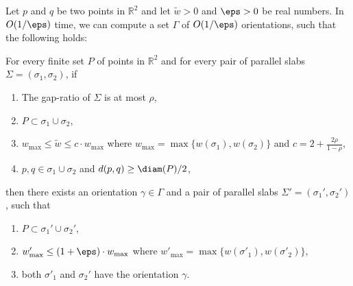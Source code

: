 



\begin{lemma}
    \label{lem:parallel_angles}
    Let $p$ and $q$ be two points in $\mathbb R^2$ and let $\widetilde w > 0$ and $\eps> 0$ be real numbers.
    In $O(1/\eps)$ time, we can compute a set $\Gamma$ of $O(1/\eps)$ orientations, such that the following holds:
    
    For every finite set $P$ of points in $\mathbb R^2$ and for every pair of parallel slabs $\Sigma= (\sigma_1, \sigma_2)$, if 
    \begin{enumerate}[(1)]
        \item The gap-ratio of $\Sigma$ is at most $\rho$, 
        \item $P\subset \sigma_1 \cup \sigma_2$, 
        \item $w_{\max} \le \widetilde w \le c\cdot w_{\max}$ where $w_{\max} = \max \{w(\sigma_1), w(\sigma_2) \}$ and $c = 2 + \frac{2\rho}{1-\rho}$,
        \item $p, q \in \sigma_1 \cup \sigma_2$ and $d(p,q) \ge \diam(P)/2$,
    \end{enumerate}
    then there exists an orientation $\gamma \in \Gamma$ and  a pair of parallel slabs $\Sigma' = (\sigma_1', \sigma_2')$, such that
    \begin{enumerate}[(1)]
        \item $P \subset \sigma_1' \cup \sigma_2'$,
        \item $w'_{\max} \le (1+ \eps) \cdot w_{\max}$ where $w'_{\max} = \max \{w(\sigma'_1), w(\sigma'_2) \}$,
        \item both $\sigma'_1$ and $\sigma_2'$ have the orientation $\gamma$.
    \end{enumerate}
\end{lemma}

